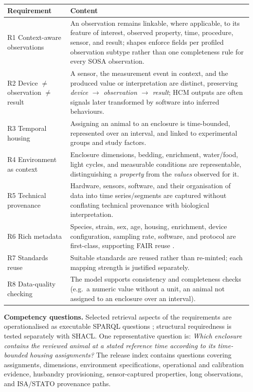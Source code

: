 \begin{table}[t]
\centering
\scriptsize
\caption{}
\label{tab:requirements}
\begin{tabularx}{\linewidth}{@{}lX@{}}
\toprule
Requirement & Content \\
\midrule
R1 Context-aware observations & An observation remains linkable, where applicable, to its feature of interest, observed property, time, procedure, sensor, and result; shapes enforce fields per profiled observation subtype rather than one completeness rule for every SOSA observation. \\
R2 Device $\neq$ observation $\neq$ result & A sensor, the measurement event in context, and the produced value or interpretation are distinct, preserving \emph{device $\rightarrow$ observation $\rightarrow$ result}; HCM outputs are often signals later transformed by software into inferred behaviours. \\
R3 Temporal housing & Assigning an animal to an enclosure is time-bounded, represented over an interval, and linked to experimental groups and study factors. \\
R4 Environment as context & Enclosure dimensions, bedding, enrichment, water/food, light cycles, and measurable conditions are representable, distinguishing a \emph{property} from the \emph{values} observed for it. \\
R5 Technical provenance & Hardware, sensors, software, and their organisation of data into time series/segments are captured without conflating technical provenance with biological interpretation. \\
R6 Rich metadata & Species, strain, sex, age, housing, enrichment, device configuration, sampling rate, software, and protocol are first-class, supporting FAIR reuse \cite{fair,forrest2026}. \\
R7 Standards reuse & Suitable standards are reused rather than re-minted; each mapping strength is justified separately. \\
R8 Data-quality checking & The model supports consistency and completeness checks (e.g.\ a numeric value without a unit, an animal not assigned to an enclosure over an interval). \\
\bottomrule
\end{tabularx}
\end{table}

\textbf{Competency questions.} Selected retrieval aspects of the requirements are operationalised as executable SPARQL questions \cite{noy2001,lot2022}; structural requiredness is tested separately with SHACL. One representative question is: \emph{Which enclosure contains the reviewed animal at a stated reference time according to its time-bounded housing assignments?} The release index contains  questions covering assignments, dimensions, environment specifications, operational and calibration evidence, husbandry provisioning, sensor-captured properties, long observations,  and ISA/STATO provenance paths.

